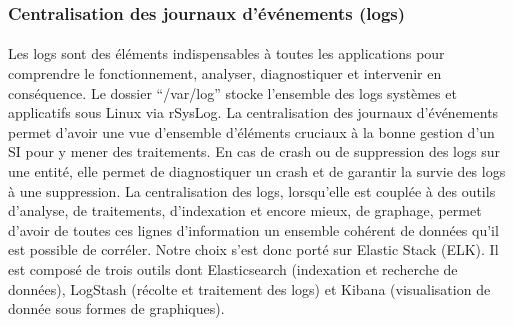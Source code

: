 	   \subsubsection{Centralisation des journaux d’événements (logs)}
	    \paragraph{}
	      Les logs sont des éléments indispensables à toutes les applications pour comprendre le fonctionnement, analyser, diagnostiquer et intervenir en conséquence. Le dossier “/var/log” stocke l’ensemble des logs systèmes et applicatifs sous Linux via rSysLog. La centralisation des journaux d’événements permet d'avoir une vue d’ensemble d’éléments cruciaux à la bonne gestion d’un SI pour y mener des traitements. En cas de crash ou de suppression des logs sur une entit\'e, elle permet de diagnostiquer un crash et de garantir la survie des logs à une suppression. La centralisation des logs, lorsqu’elle est couplée à des outils d’analyse, de traitements, d’indexation et encore mieux, de graphage, permet d’avoir de toutes ces lignes d’information un ensemble cohérent de données qu’il est possible de corréler. Notre choix s'est donc port\'e sur Elastic Stack (ELK). Il est compos\'e de trois outils dont Elasticsearch (indexation et recherche de données), LogStash (r\'ecolte et traitement des logs) et Kibana (visualisation de donnée sous formes de graphiques).
	    

